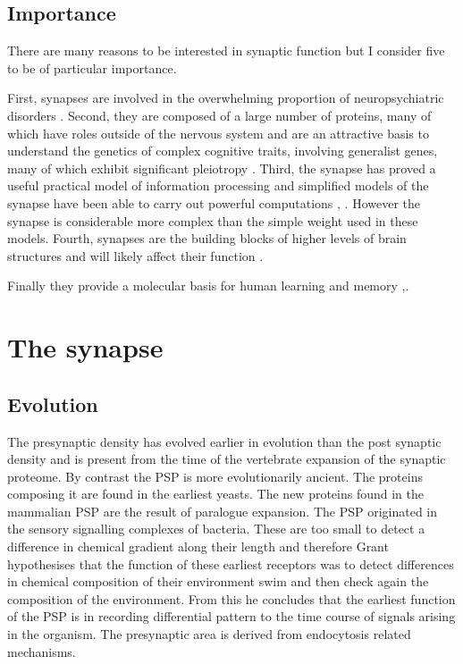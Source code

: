 \subsection{Importance}

There are many reasons to be interested in synaptic function but I consider five to be of particular importance. 

First, synapses are involved in the overwhelming proportion of neuropsychiatric disorders \cite{grant2012synaptopathies}.  Second, they are composed of a large  number of proteins, many of which have roles outside of the nervous system and are an attractive basis to understand the genetics of complex cognitive traits, involving generalist genes, many of which exhibit significant pleiotropy \cite{sharma2000induction}\cite{plomin2015genetics}. Third, the synapse has proved a useful practical model of information processing and simplified models of the synapse have been able to carry out powerful computations \cite{hinton2007learning}, \cite{dean2012three}. However the synapse is considerable more complex than the simple weight used in these models. Fourth, synapses are the building blocks of higher levels of brain structures \cite{armstrong2012evolution} and will likely affect their function \cite{dean2012three}.

Finally they provide a molecular basis for human learning and memory \cite{kandel2014molecular},\cite{gallistel2013neuroscience}.
\section{The synapse}



      



\subsection{Evolution}


The presynaptic density has evolved earlier in evolution than the post synaptic density and is present from the time of the vertebrate expansion of the synaptic proteome. By contrast the PSP is more evolutionarily ancient. The proteins composing it are found in the earliest yeasts. The new proteins found in the mammalian PSP are the result of paralogue expansion. The PSP originated in the sensory signalling complexes of bacteria. These are too small to detect a difference in chemical gradient along their length and therefore Grant hypothesises that the function of these earliest receptors was to detect differences in chemical composition of their environment swim and then check again the composition of the environment. From this he concludes that the earliest function of the PSP is in recording differential pattern to the time course of signals arising in the organism. The presynaptic area is derived from endocytosis related mechanisms.

